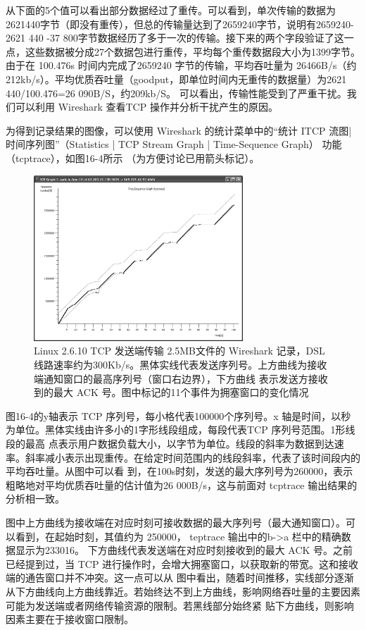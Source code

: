 从下面的5个值可以看出部分数据经过了重传。可以看到，单次传输的数据为2621440字节（即没有重传），但总的传输量达到了2659240字节，说明有2659240-
2621 440 -37 800字节数据经历了多于一次的传输。接下来的两个字段验证了这一点，这些数据被分成27个数据包进行重传，平均每个重传数据段大小为1399字节。由于在 100.476s
时间内完成了2659240 字节的传输，平均吞吐量为 26466B/s（约212kb/s）。平均优质吞吐量（goodput，即单位时间内无重传的数据量）为2621 440/100.476=26 090B/S，约209kb/S。
可以看出，传输性能受到了严重干扰。我们可以利用 Wireshark 查看TCP 操作并分析干扰产生的原因。

为得到记录结果的图像，可以使用 Wireshark 的统计菜单中的“统计 ITCP 流图| 时间序列图”（Statistics | TCP Stream Graph | Time-Sequence Graph） 功能（tcptrace），如图16-4所示
（为方便讨论已用箭头标记）。

\begin{figure}[!htb]
    \centering
	\includegraphics[width=0.7\textwidth]{imgs/16/16-4.png}
	\caption{Linux 2.6.10 TCP 发送端传输 2.5MB文件的 Wireshark 记录，DSL 线路速率约为300Kb/s。黑体实线代表发送序列号。上方曲线为接收端通知窗口的最高序列号（窗口右边界），下方曲线
    表示发送方接收到的最大 ACK 号。图中标记的11个事件为拥塞窗口的变化情况}
\end{figure}

图16-4的y轴表示 TCP 序列号，每小格代表100000个序列号。x 轴是时间，以秒为单位。黑体实线由许多小的1字形线段组成，每段代表TCP 序列号范围。1形线段的最高
点表示用户数据负载大小，以字节为单位。线段的斜率为数据到达速率。斜率减小表示出现重传。在给定时间范围内的线段斜率，代表了该时间段内的平均吞吐量。从图中可以看
到，在100s时刻，发送的最大序列号为260000，表示粗略地对平均优质吞吐量的估计值为26 000B/s，这与前面对 tcptrace 输出结果的分析相一致。

图中上方曲线为接收端在对应时刻可接收数据的最大序列号（最大通知窗口）。可以看到，在起始时刻，其值约为 250000， teptrace 输出中的b->a 栏中的精确数据显示为233016。
下方曲线代表发送端在对应时刻接收到的最大 ACK 号。之前已经提到过，当 TCP 进行操作时，会增大拥塞窗口，以获取新的带宽。这和接收端的通告窗口并不冲突。这一点可以从
图中看出，随着时间推移，实线部分逐渐从下方曲线向上方曲线靠近。若始终达不到上方曲线，影响网络吞吐量的主要因素可能为发送端或者网络传输资源的限制。若黑线部分始终紧
贴下方曲线，则影响因素主要在于接收窗口限制。

